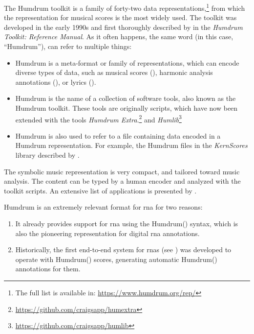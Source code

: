 


The Humdrum toolkit is a family of forty-two data
representations,\footnote{The full list is available in:
\href{https://www.humdrum.org/rep/}{https://www.humdrum.org/rep/}}
from which the  representation for musical
scores is the most widely used. The toolkit was developed in
the early 1990s and first thoroughly described by
\textcite{huron1994humdrum} in the \emph{Humdrum Toolkit:
Reference Manual}. As it often happens, the same word (in
this case, ``Humdrum''), can refer to multiple things:

\begin{itemize}
    \item Humdrum is a meta-format or family of
    representations, which can encode diverse types of data,
    such as musical scores (), harmonic
    analysis annotations (), or lyrics
    ().
    \item Humdrum is the name of a collection of software
    tools, also known as the Humdrum toolkit. These tools
    are originally  scripts, which have now been
    extended with the  tools \emph{Humdrum
    Extra}.\footnote{\href{https://github.com/craigsapp/humextra}{https://github.com/craigsapp/humextra}}
    and
    \emph{Humlib}\footnote{\href{https://github.com/craigsapp/humlib}{https://github.com/craigsapp/humlib}}
    \item Humdrum is also used to refer to a file containing
    data encoded in a Humdrum representation. For example,
    the Humdrum files in the \emph{KernScores} library
    described by \textcite{sapp2005online}.
\end{itemize}


The  symbolic music representation is very
compact, and tailored toward music analysis. The content can
be typed by a human encoder and analyzed with the toolkit
scripts. An extensive list of applications is presented by
\textcite{sapp2011computational}.


Humdrum is an extremely relevant format for \gls{rna} for
two reasons:

\begin{enumerate}
    \item It already provides support for \gls{rna} using
    the Humdrum() syntax, which is also the
    pioneering representation for digital \gls{rna}
    annotations.
    \item Historically, the first end-to-end system for
    \glspl{rna} (see
    ) was developed
    to operate with Humdrum() scores,
    generating automatic Humdrum() annotations
    for them.
\end{enumerate}
